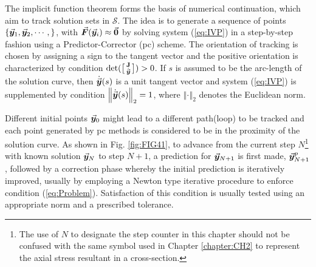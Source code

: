 The implicit function theorem forms the basis of numerical
continuation\cite{Allgower:2003,Rheinboldt75,Rheinboldt:2000,Rheinboldt:1980,
Garcia:1980,Watson86,Keller:1978}, which aim to track solution sets in 
$\mathcal{S}$. The idea is to generate a sequence of points
$\{\vec{\bm{y}}_1,\vec{\bm{y}}_2,\cdots,\}$, with 
$\vec{\bm{F}}(\vec{\bm{y}}_i)\approx\vec{\bm{0}}$  by solving system
(\ref{eq:IVP}) in a step-by-step fashion using a Predictor-Corrector 
(\acrshort{pc}) scheme. The orientation of tracking is chosen by assigning a 
sign to the tangent vector and the positive orientation is
characterized by condition $\text{det}(\bigl[
\begin{smallmatrix}
	\mathbf{J} \\ \dot{\vec{\bm{y}}}
\end{smallmatrix}
\bigr]) > 0$. If $s$ is assumed to be the arc-length of the solution curve, then
$\dot{\vec{\bm{y}}}(s)$ is a unit tangent vector and system (\ref{eq:IVP}) is 
supplemented by
condition $\left\Vert \dot{\vec{\bm{y}}}(s)\right\Vert_2=1$, where $\left\Vert
\cdot\right\Vert_2$ denotes the Euclidean norm.

Different initial points $\vec{\bm{y}}_0$ might
lead to a different path(loop) to be tracked and each point generated by 
\acrshort{pc} methods is considered to be in the proximity of the solution 
curve. As shown in Fig. \ref{fig:FIG41}, to advance from the
current step $N$\footnote{The use of $N$ to designate the step counter in this 
chapter should not be confused with the same symbol used in Chapter 
\ref{chapter:CH2} to represent the axial stress resultant in a cross-section.} 
with known solution $\vec{\bm{y}}_N$ to step $N+1$, a
prediction for $\vec{\bm{y}}_{N+1}$ is first made, $\vec{\bm{y}}_{N+1}^p$, followed by 
a 
correction phase 
whereby the initial prediction is iteratively improved, usually by employing a
Newton type iterative procedure to enforce condition (\ref{eq:Problem}). 
Satisfaction of
this condition is usually tested using an appropriate norm and a
prescribed tolerance. 

